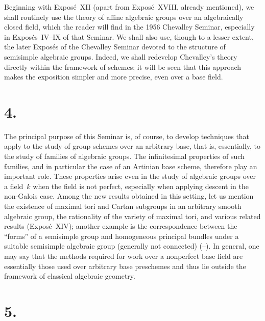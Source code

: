 Beginning with Expos\'e~XII (apart from Expos\'e~XVIII, already mentioned), we shall
routinely use the theory of affine algebraic groups over an algebraically closed
field, which the reader will find in the 1956 Chevalley Seminar, especially in
Expos\'es~IV--IX of that Seminar.  We shall also use, though to a lesser extent, the
later Expos\'es of the Chevalley Seminar devoted to the structure of semisimple
algebraic groups.  Indeed, we shall redevelop Chevalley's theory directly within the
framework of schemes; it will be seen that this approach makes the exposition
simpler and more precise, even over a base field.

\section*{4.}

The principal purpose of this Seminar is, of course, to develop techniques that
apply to the study of group schemes over an arbitrary base, that is, essentially,
to the study of families of algebraic groups.  The infinitesimal properties of such
families, and in particular the case of an Artinian base scheme, therefore play an
important role.  These properties arise even in the study of algebraic groups over
a field~$k$ when the field is not perfect, especially when applying descent in the
non-Galois case.  Among the new results obtained in this setting, let us mention the
existence of maximal tori and Cartan subgroups in an arbitrary smooth algebraic
group, the rationality of the variety of maximal tori, and various related results
(Expos\'e~XIV); another example is the correspondence between the ``forms''
of a semisimple group and homogeneous principal bundles under a suitable semisimple
algebraic group (generally not connected) (--).  In general,
one may say that the methods required for work over a nonperfect base field are
essentially those used over arbitrary base preschemes and thus lie outside the
framework of classical algebraic geometry.

\section*{5.}

